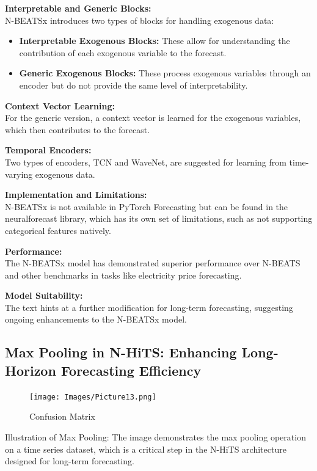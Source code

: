 \documentclass{article}
\begin{document}
\textbf{Interpretable and Generic Blocks:} \\
N-BEATSx introduces two types of blocks for handling exogenous data:

\begin{itemize}
  \item \textbf{Interpretable Exogenous Blocks:} These allow for understanding the contribution of each exogenous variable to the forecast.
  \item \textbf{Generic Exogenous Blocks:} These process exogenous variables through an encoder but do not provide the same level of interpretability.
\end{itemize}

\textbf{Context Vector Learning:} \\
For the generic version, a context vector is learned for the exogenous variables, which then contributes to the forecast.

\textbf{Temporal Encoders:} \\
Two types of encoders, TCN and WaveNet, are suggested for learning from time-varying exogenous data.

\textbf{Implementation and Limitations:} \\
N-BEATSx is not available in PyTorch Forecasting but can be found in the neuralforecast library, which has its own set of limitations, such as not supporting categorical features natively.

\textbf{Performance:} \\
The N-BEATSx model has demonstrated superior performance over N-BEATS and other benchmarks in tasks like electricity price forecasting.

\textbf{Model Suitability:} \\
The text hints at a further modification for long-term forecasting, suggesting ongoing enhancements to the N-BEATSx model.

\subsection{Max Pooling in N-HiTS: Enhancing Long-Horizon Forecasting Efficiency}

\begin{figure}
    \centering
    \texttt{[image: Images/Picture13.png]}
    \caption{Confusion Matrix}
    \label{fig:enter-labe}
\end{figure}

Illustration of Max Pooling: The image demonstrates the max pooling operation on a time series dataset, which is a critical step in the N-HiTS architecture designed for long-term forecasting.
\end{document}
